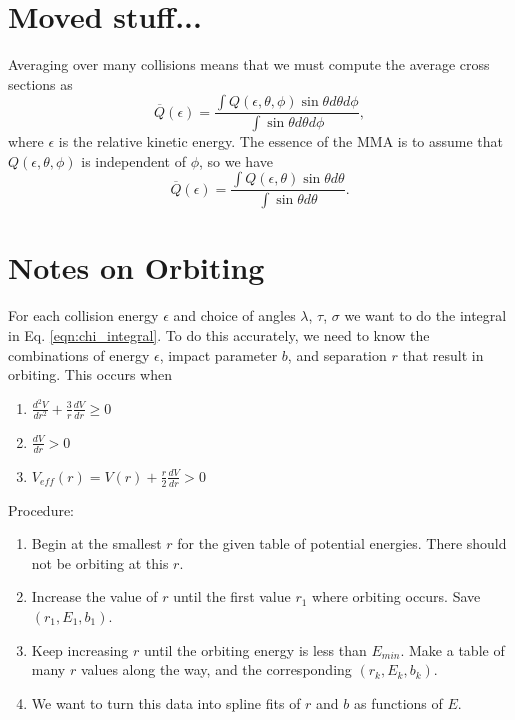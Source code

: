 \documentclass[article]{revtex4-2}
\begin{document}
\section{Moved stuff...}
Averaging over many collisions means that we must compute the average cross sections as
\begin{equation}
    \overline{Q}(\epsilon)=\frac{\int Q(\epsilon,\theta,\phi)\sin{\theta}{d\theta d\phi}} {\int \sin{\theta} {d\theta d\phi}},
    \label{2D averaging with epsilon}
\end{equation}
where $\epsilon$ is the relative kinetic energy. The essence of the MMA is to assume that $Q(\epsilon,\theta,\phi)$ is independent of $\phi$, so we have
\begin{equation}
    \overline{Q}(\epsilon)=\frac{\int Q(\epsilon,\theta)\sin{\theta}{d\theta}} {\int \sin{\theta} {d\theta}}.
    \label{2D averaging, no epsilon}
\end{equation}

\section{Notes on Orbiting}

For each collision energy $\epsilon$ and choice of angles $\lambda$, $\tau$, $\sigma$ we want to do the integral in Eq. \ref{eqn:chi_integral}. To do this accurately, we need to know the combinations of energy $\epsilon$, impact parameter $b$, and separation $r$ that result in orbiting. This occurs when
\begin{enumerate}
    \item $\displaystyle  \frac{d^2V}{dr^2} + \frac{3}{r} \frac{dV}{dr} \geq 0$
    \item $\displaystyle  \frac{dV}{dr} > 0$
    \item $V_{eff}(r) = V(r) + \frac{r}{2}\frac{dV}{dr} > 0$
\end{enumerate}

Procedure:
\begin{enumerate}
    \item Begin at the smallest $r$ for the given table of potential energies. There should not be orbiting at this $r$.
    \item Increase the value of $r$ until the first value $r_1$ where orbiting occurs. Save $(r_1, E_1, b_1)$.
    \item Keep increasing $r$ until the orbiting energy is less than $E_{min}$. Make a table of many $r$ values along the way, and the corresponding $(r_k, E_k, b_k)$.
    \item We want to turn this data into spline fits of $r$ and $b$ as functions of $E$.
    
    
\end{enumerate}
\end{document}

